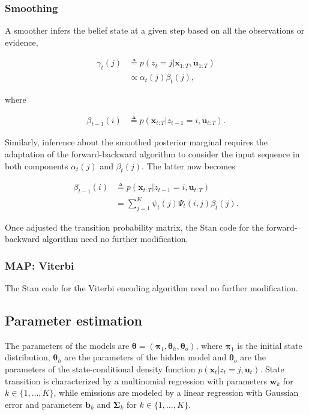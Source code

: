 \documentclass[]{article}
\newcommand{\mat}[1]{\mathbf{#1}}
\begin{document}
\subsubsection{Smoothing}\label{smoothing-1}

A smoother infers the belief state at a given step based on all the
observations or evidence,

\begin{align*}
\gamma_t(j)
  & \triangleq p(z_t = j | \mat{x}_{1:T}, \mat{u}_{1:T}) \\
  & \propto \alpha_t(j) \beta_t(j),
\end{align*}

where

\begin{align*}
\beta_{t-1}(i)
  & \triangleq p(\mat{x}_{t:T} | z_{t-1} = i, \mat{u}_{t:T}).
\end{align*}

Similarly, inference about the smoothed posterior marginal requires the
adaptation of the forward-backward algorithm to consider the input
sequence in both components \(\alpha_t(j)\) and \(\beta_t(j)\). The
latter now becomes

\begin{align*}
\beta_{t-1}(i)
  & \triangleq p(\mat{x}_{t:T} | z_{t-1} = i, \mat{u}_{t:T}) \\
  & = \sum_{j = 1}^{K}{\psi_t(j) \Psi_t(i, j) \beta_{t}(j)}.
\end{align*}

Once adjusted the transition probability matrix, the Stan code for the
forward-backward algorithm need no further modification.

\subsubsection{MAP: Viterbi}\label{map-viterbi-1}

The Stan code for the Viterbi encoding algorithm need no further
modification.

\subsection{Parameter estimation}\label{parameter-estimation-1}

The parameters of the models are
\(\mat{\theta} = (\mat{\pi}_1, \mat{\theta}_h, \mat{\theta}_o)\), where
\(\mat{\pi}_1\) is the initial state distribution, \(\mat{\theta}_h\)
are the parameters of the hidden model and \(\mat{\theta}_o\) are the
parameters of the state-conditional density function
\(p(\mat{x}_t | z_t = j, \mat{u}_t)\). State transition is characterized
by a multinomial regression with parameters \(\mat{w}_k\) for
\(k \in \{1, \dots, K\}\), while emissions are modeled by a linear
regression with Gaussian error and parameters \(\mat{b}_k\) and
\(\mat{\Sigma}_k\) for \(k \in \{1, \dots, K\}\).
\end{document}
